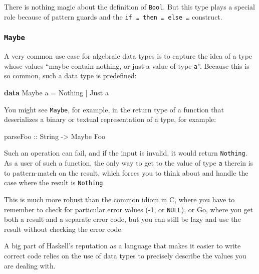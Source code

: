 \documentclass[11pt,
  american,
  DIV13]{article}
\newenvironment{Shaded}{}{}
\newcommand{\DataTypeTok}[1]{\textcolor[rgb]{0.56,0.13,0.00}{#1}}
\newcommand{\KeywordTok}[1]{\textcolor[rgb]{0.00,0.44,0.13}{\textbf{#1}}}
\newcommand{\NormalTok}[1]{#1}
\newcommand{\OperatorTok}[1]{\textcolor[rgb]{0.40,0.40,0.40}{#1}}
\newcommand{\OtherTok}[1]{\textcolor[rgb]{0.00,0.44,0.13}{#1}}
\begin{document}
There is nothing magic about the definition of \texttt{Bool}. But this
type plays a special role because of pattern guards and the
\texttt{if\ \ldots{}\ then\ \ldots{}\ else\ \ldots{}} construct.

\hypertarget{maybe}{%
\subsubsection{\texorpdfstring{\texttt{Maybe}}{Maybe}}\label{maybe}}

A very common use case for algebraic data types is to capture the idea
of a type whose values ``maybe contain nothing, or just a value of type
\texttt{a}''. Because this is so common, such a data type is predefined:

\begin{Shaded}
\begin{Highlighting}[]
\KeywordTok{data} \DataTypeTok{Maybe}\NormalTok{ a }\OtherTok{=} \DataTypeTok{Nothing} \OperatorTok{|} \DataTypeTok{Just}\NormalTok{ a}
\end{Highlighting}
\end{Shaded}

You might see \texttt{Maybe}, for example, in the return type of a
function that deserializes a binary or textual representation of a type,
for example:

\begin{Shaded}
\begin{Highlighting}[]
\OtherTok{parseFoo ::} \DataTypeTok{String} \OtherTok{{-}\textgreater{}} \DataTypeTok{Maybe} \DataTypeTok{Foo}
\end{Highlighting}
\end{Shaded}

Such an operation can fail, and if the input is invalid, it would return
\texttt{Nothing}. As a user of such a function, the only way to get to
the value of type \texttt{a} therein is to pattern-match on the result,
which forces you to think about and handle the case where the result is
\texttt{Nothing}.

This is much more robust than the common idiom in C, where you have to
remember to check for particular error values (-1, or \texttt{NULL}), or
Go, where you get both a result and a separate error code, but you can
still be lazy and use the result without checking the error code.

A big part of Haskell's reputation as a language that makes it easier to
write correct code relies on the use of data types to precisely describe
the values you are dealing with.
\end{document}
